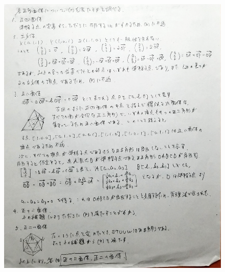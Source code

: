 \documentclass[dvipdfmx]{jsarticle}
\begin{document}
\begin{figure}[h]
  \centering
  \includegraphics[width=14cm]{AMC002-picture/mathtest4.png}
\end{figure}
\newpage
\end{document}
